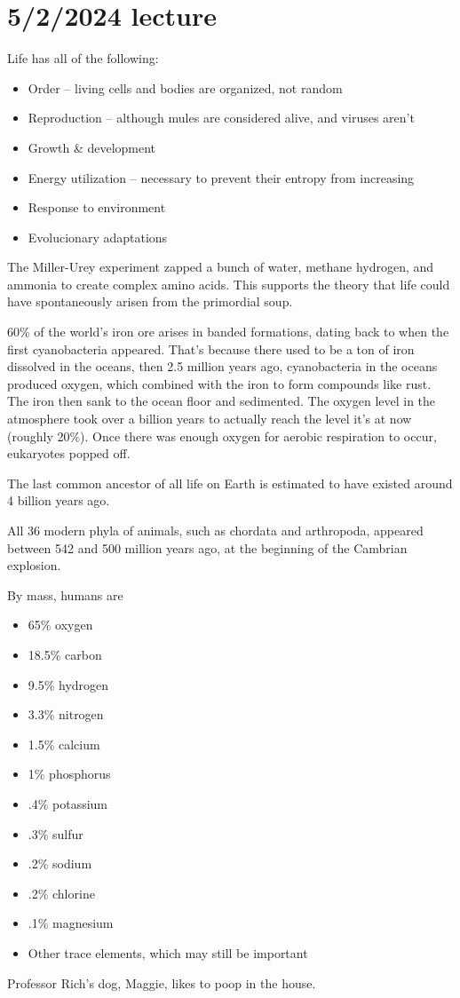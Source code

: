 \documentclass[class=article, crop=false]{standalone}
\begin{document}
\section{5/2/2024 lecture}
Life has all of the following:
\begin{itemize}
    \item Order -- living cells and bodies are organized, not random
    \item Reproduction -- although mules are considered alive, and viruses aren't
    \item Growth \& development
    \item Energy utilization -- necessary to prevent their entropy from increasing
    \item Response to environment
    \item Evolucionary adaptations
\end{itemize}
The Miller-Urey experiment zapped a bunch of water, methane hydrogen, and ammonia to create complex amino acids. This supports the theory that life could have spontaneously arisen from the primordial soup.
\par
60\% of the world's iron ore arises in banded formations, dating back to when the first cyanobacteria appeared. That's because there used to be a ton of iron dissolved in the oceans, then 2.5 million years ago, cyanobacteria in the oceans produced oxygen, which combined with the iron to form compounds like rust. The iron then sank to the ocean floor and sedimented. The oxygen level in the atmosphere took over a billion years to actually reach the level it's at now (roughly 20\%). Once there was enough oxygen for aerobic respiration to occur, eukaryotes popped off.
\par
The last common ancestor of all life on Earth is estimated to have existed around 4 billion years ago.
\par
All 36 modern phyla of animals, such as chordata and arthropoda, appeared between 542 and 500 million years ago, at the beginning of the Cambrian explosion.
\par
By mass, humans are
\begin{itemize}
    \item 65\% oxygen
    \item 18.5\% carbon
    \item 9.5\% hydrogen
    \item 3.3\% nitrogen
    \item 1.5\% calcium
    \item 1\% phosphorus
    \item .4\% potassium
    \item .3\% sulfur
    \item .2\% sodium
    \item .2\% chlorine
    \item .1\% magnesium
    \item Other trace elements, which may still be important
\end{itemize}
Professor Rich's dog, Maggie, likes to poop in the house.
\end{document}
